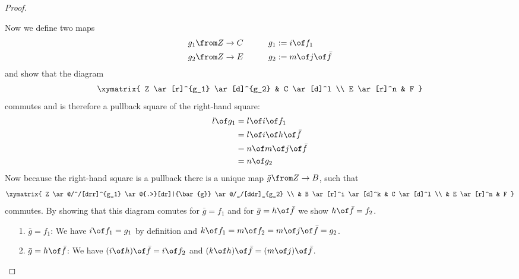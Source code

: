 \begin{answer}
\begin{proof}
\begin{itemize}
        Now we define two maps
        \begin{alignat*}{4}
          g_1 &\from Z \to C&  \qquad g_1 &:= i \of f_1 \\
          g_2 &\from Z \to E&         g_2 &:= m \of j \of \bar{f}
        \end{alignat*}
        and show that the diagram
        \[ \xymatrix{
          Z \ar[r]^{g_1} \ar[d]^{g_2} & C \ar[d]^l \\
          E \ar[r]^n & F
        } \]
        commutes and is therefore a pullback square of the right-hand square:
        \begin{alignat*}{2}
          l \of g_1
          &= l \of i \of f_1 \\
          &= l \of i \of h \of \bar{f} \\
          &= n \of m \of j \of \bar{f} \\
          &= n \of g_2
        \end{alignat*}
        Now because the right-hand square is a pullback there is a unique map $\bar{g} \from Z \to B$, such that
        \[ \xymatrix{
          Z \ar@/^/[drr]^{g_1}
            \ar@{.>}[dr]|{\bar{g}}
            \ar@/_/[ddr]_{g_2} \\
          & B \ar[r]^i \ar[d]^k & C \ar[d]^l \\
          & E \ar[r]^n & F
        } \]
        commutes.
        By showing that this diagram comutes for $\bar{g} = f_1$ and for $\bar{g} = h \of \bar{f}$ we show $h \of \bar{f} = f_2$.
        \begin{itemize}
          \item[1.]$\bar{g} = f_1$: We have $i \of f_1 = g_1$ by definition and $k \of f_1 = m \of f_2 = m \of j \of \bar{f} = g_2$.
          \item[2.]$\bar{g} = h \of \bar{f}$: We have $(i \of h) \of \bar{f} = i \of f_2$ and $(k \of h) \of \bar{f} = (m \of j) \of \bar{f}$.
        \end{itemize}


\end{itemize}
\end{proof}
\end{answer}
